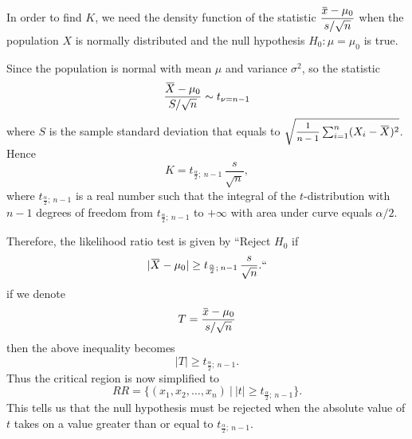 \begin{solution}
    In order to find $K$, we need the density function of the statistic $\displaystyle \frac{\ols{x} - \mu_0}{s/\sqrt{n}}$
    when the population $X$ is normally distributed and the null hypothesis 
    $H_0 : \mu = \mu_0$ is true.

    Since the population is normal with mean $\mu$ and variance $\sigma^2$, so the statistic
    \[
        \frac{\ols{X} - \mu_0}{S / \sqrt{n}} \sim t_{\nu = n-1}
    \]
    where $S$ is the sample standard deviation that equals to $\sqrt{\mfrac{1}{n-1} \sum^n_{i=1} (X_i - \ols{X})^2}$. Hence 
    \[
        K = t_{\frac{\alpha}{2};\> n-1} \, \frac{s}{\sqrt{n}},
    \]
    where $t_{\frac{\alpha}{2};\> n-1}$ is a real number such that the integral of the $t$-distribution 
    with $n-1$ degrees of freedom from $t_{\frac{\alpha}{2};\> n-1}$ to $+\infty$ with 
    area under curve equals $\alpha / 2$.

    Therefore, the likelihood ratio test is given by ``Reject $H_0$ if 
    \[
        |\ols{X} - \mu_0| \geq t_{\frac{\alpha}{2};\> n-1} \, \frac{s}{\sqrt{n}}. ``
    \]
    if we denote 
    \[
        T = \frac{\ols{x} - \mu_0}{s / \sqrt{n}}
    \]
    then the above inequality becomes 
    \[
        |T| \geq t_{\frac{\alpha}{2};\> n-1}.
    \]
    Thus the critical region is now simplified to 
    \begin{equation}
        RR = \{ (x_1, x_2, \ldots, x_n) \> | \> |t| \geq t_{\frac{\alpha}{2};\> n-1} \}.
    \end{equation}
    This tells us that the null hypothesis must be rejected when the absolute value of $t$ 
    takes on a value greater than or equal to $t_{\frac{\alpha}{2};\> n-1}$.
\end{solution}
